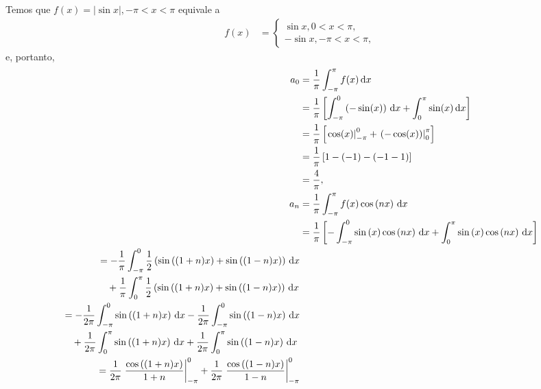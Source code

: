 \documentclass[a4paper,12pt, leqno, answers]{exam}
\begin{document}
\begin{questions}
\begin{parts}
\begin{solution}
      Temos que $f(x) = | \sin x |, -\pi < x < \pi$ equivale a
      \begin{align*}
        f(x) &= \begin{cases}
          \sin x, 0 < x < \pi, \\
          -\sin x, -\pi < x < \pi,
        \end{cases}
      \end{align*}
      e, portanto,
      \begin{align*}
        a_0 &= \frac{1}{\pi} \int_{-\pi}^\pi f(x) \id{x} \\
        &= \frac{1}{\pi} \left[ \int_{-\pi}^0 \left( - \sin(x) \right) \id{x} + \int_0^\pi \sin(x) \id{x} \right] \\
        &= \frac{1}{\pi} \left[ \left. \cos(x) \right|_{-\pi}^0 + \left. \left( -\cos(x) \right) \right|_0^\pi \right] \\
        &= \frac{1}{\pi} \left[ 1 - (-1) - \left( -1 - 1 \right) \right] \\
        &= \frac{4}{\pi}, \\
        a_n &= \frac{1}{\pi} \int_{-\pi}^\pi f(x) \cos\left( n x \right) \id{x} \\
        &= \frac{1}{\pi} \left[ -\int_{-\pi}^0 \sin\left( x \right) \cos\left( n x \right) \id{x} + \int_0^\pi \sin\left( x \right) \cos\left( n x \right) \id{x} \right] \\
        \begin{split}
          &= - \frac{1}{\pi} \int_{-\pi}^0 \frac{1}{2} \left( \sin\left( (1 + n) x \right) + \sin\left( (1 - n) x \right) \right) \id{x} \\
          &\quad {}+ \frac{1}{\pi} \int_0^\pi \frac{1}{2} \left( \sin\left( (1 + n) x \right) + \sin\left( (1 - n) x \right) \right) \id{x} \\
        \end{split} \\
        \begin{split}
          &= - \frac{1}{2 \pi} \int_{-\pi}^0 \sin\left( (1 + n) x \right) \id{x} - \frac{1}{2 \pi} \int_{-\pi}^0 \sin\left( (1 - n) x \right) \id{x} \\
          &\quad {}+ \frac{1}{2 \pi} \int_0^\pi \sin\left( (1 + n) x \right) \id{x} + \frac{1}{2 \pi} \int_0^\pi \sin\left( (1 - n) x \right) \id{x}
        \end{split} \\
        \begin{split}
          &= \frac{1}{2 \pi} \left. \frac{\cos\left( (1 + n) x \right)}{1 + n} \right|_{-\pi}^0 + \frac{1}{2 \pi} \left. \frac{\cos\left( (1 - n) x \right)}{1 - n} \right|_{-\pi}^0 \\

\end{split}
\end{align*}
\end{solution}
\end{parts}
\end{questions}
\end{document}
